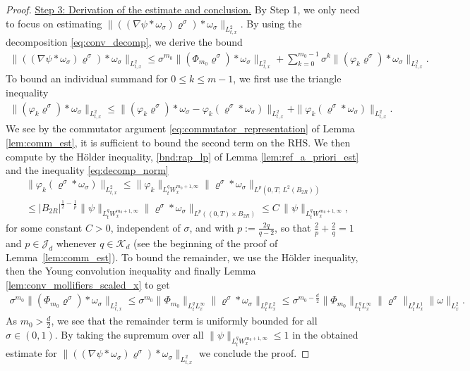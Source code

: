 \documentclass[reqno, 11pt]{amsart}
\numberwithin{equation}{section}
\theoremstyle{definition}
\begin{document}
\begin{proof}
    \underline{Step 3: Derivation of the estimate and conclusion.}
    By Step 1, we only need to focus on estimating $\|((\nabla\psi\ast \omega_\sigma)\varrho^\sigma)\ast\omega_\sigma\|_{L_{t,x}^2}$. By using the decomposition \eqref{eq:conv_decomp}, we derive the bound
    \begin{align*}
        \|((\nabla\psi\ast \omega_\sigma)\varrho^\sigma)\ast\omega_\sigma\|_{L_{t,x}^2}
        \leq \sigma^{m_0}\|(\Phi_{m_0}\varrho^\sigma)\ast\omega_\sigma\|_{L_{t,x}^2}+\sum_{k=0}^{m_0-1} \sigma^{k}\|(\varphi_k\varrho^\sigma)\ast\omega_\sigma\|_{L_{t,x}^2}.
    \end{align*}
    To bound an individual summand for $0 \leq k \leq m-1$, we first use the triangle inequality
    \begin{align*}
        \|(\varphi_k\varrho^\sigma)\ast\omega_\sigma\|_{L_{t,x}^2}
        \leq \|(\varphi_k\varrho^\sigma)\ast\omega_\sigma-\varphi_k(\varrho^\sigma\ast\omega_\sigma)\|_{L_{t,x}^2}+\|\varphi_k(\varrho^\sigma\ast\omega_\sigma)\|_{L_{t,x}^2}.
    \end{align*}
    We see by the commutator argument \eqref{eq:commutator_representation} of Lemma \ref{lem:comm_est}, it is sufficient to bound the second term on the RHS. We then compute by the H\"older inequality, \ref{bnd:rap_lp} of Lemma \ref{lem:ref_a_priori_est} and the inequality \eqref{eq:decomp_norm}
    \begin{align*}
        &\|\varphi_k(\varrho^\sigma\ast\omega_\sigma)\|_{L_{t,x}^2}
        \leq \|\varphi_k\|_{L_t^q W_x^{m_0+1,\infty}}\|\varrho^\sigma\ast\omega_\sigma\|_{L^p(0,T;\, L^2(B_{2R}))}\\
        &\leq |B_{2R}|^{\frac{1}{2}-\frac{1}{p}}\|\psi\|_{L_t^q W_x^{m_0+1,\infty}}\|\varrho^\sigma\ast\omega_\sigma\|_{L^p((0,T)\times B_{2R})}
        \leq C\,\|\psi\|_{L_t^q W_x^{m_0+1,\infty}},
    \end{align*}
    for some constant $C>0$, independent of $\sigma$, and with $p:=\frac{2q}{q-2}$, so that $\frac{2}{p}+\frac{2}{q}=1$ and $p\in\mathcal{J}_d$ whenever $q\in\mathcal{K}_d$ (see the beginning of the proof of Lemma~\ref{lem:comm_est}). To bound the remainder, we use the H\"older inequality, then the Young convolution inequality and finally Lemma \ref{lem:conv_mollifiers_scaled_x} to get
    \begin{align*}
        \sigma^{m_0}\|(\Phi_{m_0}\varrho^\sigma)\ast\omega_\sigma\|_{L_{t,x}^2}
        \leq \sigma^{m_0}\|\Phi_{m_0}\|_{L_t^q L_x^\infty}\|\varrho^\sigma\ast\omega_\sigma\|_{L_t^p L_x^2}
        \leq \sigma^{m_0-\frac{d}{2}}\|\Phi_{m_0}\|_{L_t^q L_x^\infty}\|\varrho^\sigma\|_{L_t^p L_x^1}\|\omega\|_{L_x^2}.
    \end{align*}
    As $m_0>\frac{d}{2}$, we see that the remainder term is uniformly bounded for all $\sigma\in (0,1)$. By taking the supremum over all $\|\psi\|_{L_t^q W_x^{m_0+1,\infty}}\leq 1$ in the obtained estimate for $\|((\nabla\psi\ast \omega_\sigma)\varrho^\sigma)\ast\omega_\sigma\|_{L_{t,x}^2}$ we conclude the proof.
\end{proof}
\end{document}
